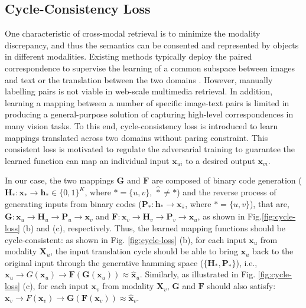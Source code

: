\documentclass[10pt,journal,twocolumn]{IEEEtran}
\begin{document}
\subsection{Cycle-Consistency Loss}

One characteristic of cross-modal retrieval is to minimize the modality discrepancy, and thus the semantics can be consented and represented by objects in different modalities. Existing methods typically deploy the paired correspondence to supervise the learning of a common subspace between images and text \cite{Coupled-modal,LBMCH} or the translation between the two domains \cite{TUCH}. However, manually labelling pairs is not viable in web-scale multimedia retrieval. In addition, learning a mapping between a number of specific image-text pairs is limited in producing a general-purpose solution of capturing high-level correspondences in many vision tasks. To this end, cycle-consistency loss \cite{CycleGAN} is introduced to learn mappings translated across two domains without paring constraint. This consistent loss is motivated to regulate the adversarial training to guarantee the learned function can map an individual input $\boldsymbol x_{ui}$ to a desired output $\boldsymbol x_{vi}$.


In our case, the two mappings $\boldsymbol G$ and $\boldsymbol F$ are composed of binary code generation ($\boldsymbol H_{\ast}: \boldsymbol x_{\ast} \rightarrow \boldsymbol h_{\ast} \in \{0,1\}^{K}$, where $\ast=\{u, v\}$, $\hat{\ast}\neq \ast$) and the reverse process of generating inputs from binary codes ($\boldsymbol P_{\ast}: \boldsymbol h_{\ast} \rightarrow \boldsymbol x_{\hat{\ast}}$, where $\ast=\{u, v\}$), that are, $\boldsymbol G: \boldsymbol x_u \rightarrow \boldsymbol H_u \rightarrow \boldsymbol P_u \rightarrow \boldsymbol x_v$ and $\boldsymbol F: \boldsymbol x_v \rightarrow \boldsymbol H_v \rightarrow \boldsymbol P_v \rightarrow \boldsymbol x_u$, as shown in Fig.\ref{fig:cycle-loss} (b) and (c), respectively. Thus, the learned mapping functions should be cycle-consistent: as shown in Fig. \ref{fig:cycle-loss} (b), for each input $\boldsymbol x_u$ from modality $\boldsymbol X_u$, the input translation cycle should be able to bring $\boldsymbol x_u$ back to the original input through the generative hamming space ($\{\boldsymbol H_{\ast}, \boldsymbol P_{\ast} \}$), i.e., $\boldsymbol x_u \rightarrow G(\boldsymbol x_u) \rightarrow \boldsymbol F( \boldsymbol G(\boldsymbol x_u)) \approx \hat{\boldsymbol x}_u$. Similarly, as illustrated in Fig. \ref{fig:cycle-loss} (c), for each input $\boldsymbol x_v$ from modality $\boldsymbol X_v$, $\boldsymbol G$ and $\boldsymbol F$ should also satisfy: $\boldsymbol x_v \rightarrow F(\boldsymbol x_v) \rightarrow \boldsymbol G(\boldsymbol F(\boldsymbol x_v)) \approx \hat{\boldsymbol x}_v$.
\end{document}
